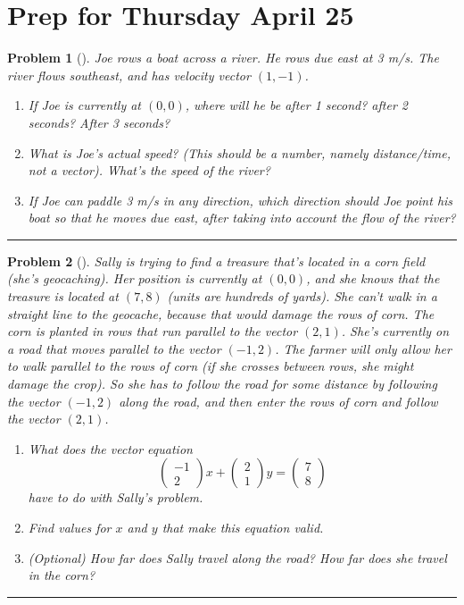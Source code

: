\documentclass[letterpaper,oneside]{book}%
\theoremstyle{plain}
\theoremstyle{box}
\theoremstyle{problem}
\newtheorem{problemnum}{Problem}[chapter]
\newenvironment{problem}[1][]{\begin{problemnum}[#1]}{\end{problemnum}\nopagebreak\hrule\bigskip}
\begin{document}
\section{Prep for Thursday April 25}

\begin{problem}
 Joe rows a boat across a river.  He rows due east at  3 m/s.  The river flows southeast, and has velocity vector $(1,-1)$.  
\begin{enumerate}
 \item If Joe is currently at $(0,0)$, where will he be after 1 second? after 2 seconds?  After 3 seconds?
 \item What is Joe's actual speed? (This should be a number, namely distance/time, not a vector).  What's the speed of the river? 
 \item If Joe can paddle 3 m/s in any direction, which direction should Joe point his boat so that he moves due east, after taking into account the flow of the river?
\end{enumerate}
\end{problem}


\begin{problem}
 Sally is trying to find a treasure that's located in a corn field (she's geocaching). 
Her position is currently at $(0,0)$, and she knows that the treasure is located at $(7,8)$ (units are hundreds of yards). 
She can't walk in a straight line to the geocache, because that would damage the rows of corn.  
The corn is planted in rows that run parallel to the vector $(2,1)$.  
She's currently on a road that moves parallel to the vector $(-1,2)$. 
The farmer will only allow her to walk parallel to the rows of corn (if she crosses between rows, she might damage the crop).  
So she has to follow the road for some distance by following the vector $(-1,2)$ along the road, and then enter the rows of corn and follow the vector $(2,1)$.   
\begin{enumerate}
 \item 
What does the vector equation 
$$\begin{pmatrix}-1\\2\end{pmatrix}x+\begin{pmatrix}2\\1\end{pmatrix}y=\begin{pmatrix}7\\8\end{pmatrix}$$ 
have to do with Sally's problem.
 \item 
Find values for $x$ and $y$ that make this equation valid. 
 \item 
(Optional) How far does Sally travel along the road?  How far does she travel in the corn?
\end{enumerate}

\end{problem}
\end{document}
